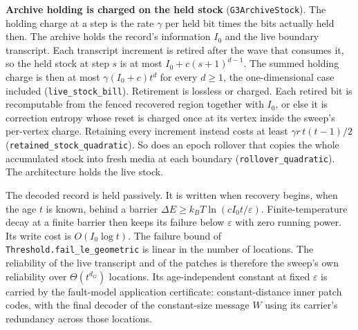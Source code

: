 \documentclass[
]{article}
\begin{document}
\textbf{Archive holding is charged on the held stock}
(\texttt{G3ArchiveStock}). The holding charge at a step is the rate
\(\gamma\) per held bit times the bits actually held then. The archive
holds the record's information \(I_0\) and the live boundary transcript.
Each transcript increment is retired after the wave that consumes it, so
the held stock at step \(s\) is at most \(I_0+c(s+1)^{d-1}\). The summed
holding charge is then at most \(\gamma(I_0+c)t^{d}\) for every
\(d\ge1\), the one-dimensional case included
(\texttt{live\_stock\_bill}). Retirement is lossless or charged. Each
retired bit is recomputable from the fenced recovered region together
with \(I_0\), or else it is correction entropy whose reset is charged
once at its vertex inside the sweep's per-vertex charge. Retaining every
increment instead costs at least \(\gamma r\,t(t-1)/2\)
(\texttt{r\allowbreak{}e\allowbreak{}t\allowbreak{}a\allowbreak{}i\allowbreak{}n\allowbreak{}e\allowbreak{}d\allowbreak{}\_\allowbreak{}s\allowbreak{}t\allowbreak{}o\allowbreak{}c\allowbreak{}k\allowbreak{}\_\allowbreak{}q\allowbreak{}u\allowbreak{}a\allowbreak{}d\allowbreak{}r\allowbreak{}a\allowbreak{}t\allowbreak{}i\allowbreak{}c}).
So does an epoch rollover that copies the whole accumulated stock into
fresh media at each boundary
(\texttt{r\allowbreak{}o\allowbreak{}l\allowbreak{}l\allowbreak{}o\allowbreak{}v\allowbreak{}e\allowbreak{}r\allowbreak{}\_\allowbreak{}q\allowbreak{}u\allowbreak{}a\allowbreak{}d\allowbreak{}r\allowbreak{}a\allowbreak{}t\allowbreak{}i\allowbreak{}c}).
The architecture holds the live stock.

The decoded record is held passively. It is written when recovery
begins, when the age \(t\) is known, behind a barrier
\(\Delta E\ge k_BT\ln(cI_0t/\varepsilon)\). Finite-temperature decay at
a finite barrier then keeps its failure below \(\varepsilon\) with zero
running power. Its write cost is \(O(I_0\log t)\). The failure bound of
\texttt{T\allowbreak{}h\allowbreak{}r\allowbreak{}e\allowbreak{}s\allowbreak{}h\allowbreak{}o\allowbreak{}l\allowbreak{}d\allowbreak{}.\allowbreak{}f\allowbreak{}a\allowbreak{}i\allowbreak{}l\allowbreak{}\_\allowbreak{}l\allowbreak{}e\allowbreak{}\_\allowbreak{}g\allowbreak{}e\allowbreak{}o\allowbreak{}m\allowbreak{}e\allowbreak{}t\allowbreak{}r\allowbreak{}i\allowbreak{}c}
is linear in the number of locations. The reliability of the live
transcript and of the patches is therefore the sweep's own reliability
over \(\Theta(t^{d_G})\) locations. Its age-independent constant at
fixed \(\varepsilon\) is carried by the fault-model application
certificate: constant-distance inner patch codes, with the final decoder
of the constant-size message \(W\) using its carrier's redundancy across
those locations.
\end{document}
